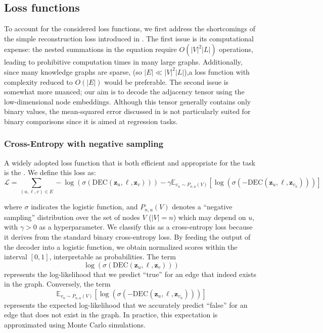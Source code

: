 \subsection{Loss functions}
To account for the considered loss functions, we first address the shortcomings of the simple reconstruction loss introduced in . The first issue is its computational expense: the nested summations in the equation require $ O(|V|^2|L|) $ operations, leading to prohibitive computation times in many large graphs. Additionally, since many knowledge graphs are sparse, (so $ |E| \ll |V|^2|L| $),a loss function with complexity reduced to $ O(|E|) $ would be preferable. The second issue is somewhat more nuanced; our aim is to decode the adjacency tensor using the low-dimensional node embeddings. Although this tensor generally contains only binary values, the mean-squared error discussed in  is not particularly suited for binary comparisons since it is aimed at regression tasks.

\subsubsection{Cross-Entropy with negative sampling}\label{sec:crossEntropyLossNegSampling}
A widely adopted loss function that is both efficient and appropriate for the task is the . We define this loss as:
\begin{equation*}
    \mathcal{L} = \sum_{(u,\ell,v)\in E} -\log(\sigma(\text{DEC}(\mathbf{z}_u, \ell, \mathbf{z}_v))) - \gamma\mathbb{E}_{v_n\sim P_{n,u}(V)}[\log(\sigma(-\text{DEC}(\mathbf{z}_u, \ell, \mathbf{z}_{v_n})))]
\end{equation*}

where $ \sigma $ indicates the logistic function, and $ P_{n,u}(V) $ denotes a ``negative sampling'' distribution over the set of nodes $ V $ ($|V|=n$) which may depend on $ u $, with $ \gamma > 0 $ as a hyperparameter. 
We classify this as a cross-entropy loss because it derives from the standard binary cross-entropy loss. By feeding the output of the decoder into a logistic function, we obtain normalized scores within the interval $[0,1]$, interpretable as probabilities. The term
\begin{equation}\label{eq:logLikelihood}
    \log(\sigma(\text{DEC}(\mathbf{z}_u, \ell, \mathbf{z}_v)))
\end{equation}
represents the log-likelihood that we predict ``true'' for an edge that indeed exists in the graph. Conversely, the term
\begin{equation}\label{eq:negativeLogLikelihood}
    \mathbb{E}_{v_n\sim P_{n,u}(V)}[\log(\sigma(-\text{DEC}(\mathbf{z}_u, \ell, \mathbf{z}_{v_n})))]
\end{equation}
represents the expected log-likelihood that we accurately predict ``false'' for an edge that does not exist in the graph. In practice, this expectation is approximated using Monte Carlo simulations.

